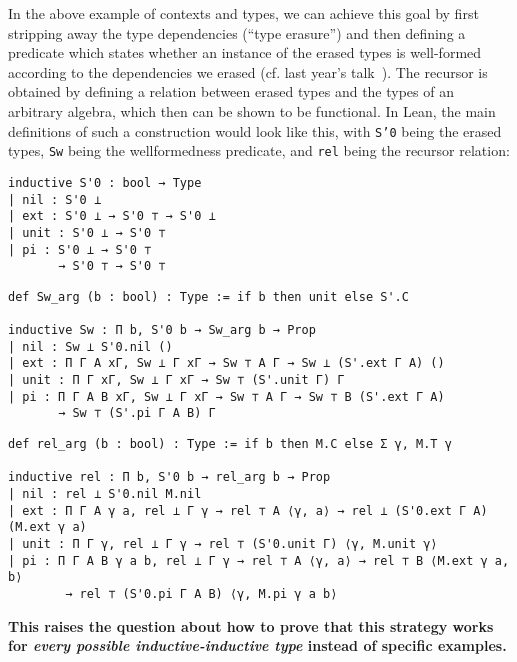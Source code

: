 \documentclass{easychair}
\begin{document}
In the above example of contexts and types, we can achieve this goal by
first stripping away the type dependencies (``type erasure'') and then defining
a predicate which states whether an instance of the erased types is well-formed
according to the dependencies we erased (cf. last year's talk~\cite{types2018}).
The recursor is obtained by defining a relation between erased types and the
types of an arbitrary algebra, which then can be shown to be functional.
In Lean, the main definitions of such a construction would look like this, with
\texttt{S'0} being the erased types, \texttt{Sw} being the wellformedness predicate,
and \texttt{rel} being the recursor relation:
\noindent
\begin{minipage}{.33\textwidth}
\begin{lstlisting}
inductive S'0 : bool → Type
| nil : S'0 ⊥
| ext : S'0 ⊥ → S'0 ⊤ → S'0 ⊥
| unit : S'0 ⊥ → S'0 ⊤
| pi : S'0 ⊥ → S'0 ⊤
       → S'0 ⊤ → S'0 ⊤
\end{lstlisting}
\end{minipage} \hfill
\begin{minipage}{.65\textwidth}
\begin{lstlisting}
def Sw_arg (b : bool) : Type := if b then unit else S'.C

inductive Sw : Π b, S'0 b → Sw_arg b → Prop
| nil : Sw ⊥ S'0.nil ()
| ext : Π Γ A xΓ, Sw ⊥ Γ xΓ → Sw ⊤ A Γ → Sw ⊥ (S'.ext Γ A) ()
| unit : Π Γ xΓ, Sw ⊥ Γ xΓ → Sw ⊤ (S'.unit Γ) Γ
| pi : Π Γ A B xΓ, Sw ⊥ Γ xΓ → Sw ⊤ A Γ → Sw ⊤ B (S'.ext Γ A)
       → Sw ⊤ (S'.pi Γ A B) Γ
\end{lstlisting}
\end{minipage}
\noindent\begin{minipage}{\textwidth}\begin{lstlisting}
def rel_arg (b : bool) : Type := if b then M.C else Σ γ, M.T γ

inductive rel : Π b, S'0 b → rel_arg b → Prop
| nil : rel ⊥ S'0.nil M.nil
| ext : Π Γ A γ a, rel ⊥ Γ γ → rel ⊤ A ⟨γ, a⟩ → rel ⊥ (S'0.ext Γ A) (M.ext γ a)
| unit : Π Γ γ, rel ⊥ Γ γ → rel ⊤ (S'0.unit Γ) ⟨γ, M.unit γ⟩
| pi : Π Γ A B γ a b, rel ⊥ Γ γ → rel ⊤ A ⟨γ, a⟩ → rel ⊤ B ⟨M.ext γ a, b⟩
        → rel ⊤ (S'0.pi Γ A B) ⟨γ, M.pi γ a b⟩
\end{lstlisting}
\end{minipage}

\noindent \textbf{This raises the question about how to prove that this strategy works for \emph{every
possible inductive-inductive type} instead of specific examples.}
\end{document}
